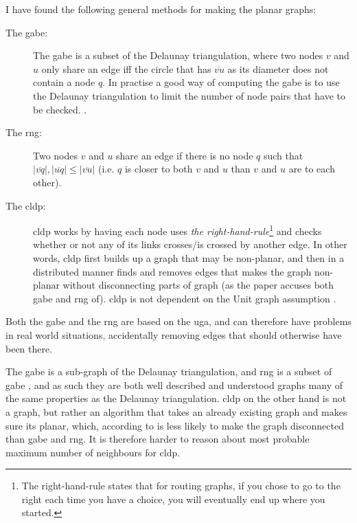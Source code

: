 I have found the following general methods for making the planar graphs:
\begin{description}
\item[The \ac{gabe}:] The \ac{gabe} is a subset of the Delaunay triangulation, where two nodes $v$ and $u$ only share an edge iff the circle that has $\overline{vu}$ as its diameter does not contain a node $q$. In practise a good way of computing the \ac{gabe} is to use the Delaunay triangulation to limit the number of node pairs that have to be checked.
\cite{gpsr, gopher}. 
\item[The \ac{rng}:] Two nodes $v$ and $u$ share an edge if there is no node $q$ such that $|\overline{vq}|, |\overline{uq}| \leq |\overline{vu}|$ (i.e. $q$ is closer to both $v$ and $u$ than $v$ and $u$ are to each other). \cite{gpsr, RNG}
\item[The \ac{cldp}:] \ac{cldp} works by having each node uses \emph{the right-hand-rule}\label{right-hand rule}\footnote{The right-hand-rule states that for routing graphs, if you chose to go to the right each time you have a choice, you will eventually end up where you started.} and checks whether or not any of its links crosses/is crossed by another edge. In other words, \ac{cldp} first builds up a graph that may be non-planar, and then in a distributed manner finds and removes edges that makes the graph non-planar without disconnecting parts of graph (as the paper accuses both \ac{gabe} and \ac{rng} of). \ac{cldp} is not dependent on the Unit graph assumption \cite{practical}. 
\end{description}

Both the \ac{gabe} and the \ac{rng} are based on the \ac{uga}, and can therefore have problems in real world situations, accidentally removing edges that should otherwise have been there\cite{practical}.


The \ac{gabe} is a sub-graph of the Delaunay triangulation\cite{GGExpected}, and \ac{rng} is a subset of \ac{gabe} \cite{GGExpected}, and as such they are both well described and understood graphs many of the same properties as the Delaunay triangulation. \ac{cldp} on the other hand is not a graph, but rather an algorithm that takes an already existing graph and makes sure its planar, which, according to \cite{practical} is less likely to make the graph disconnected than \ac{gabe} and \ac{rng}. It is therefore harder to reason about most probable maximum number of neighbours for \ac{cldp}. 

